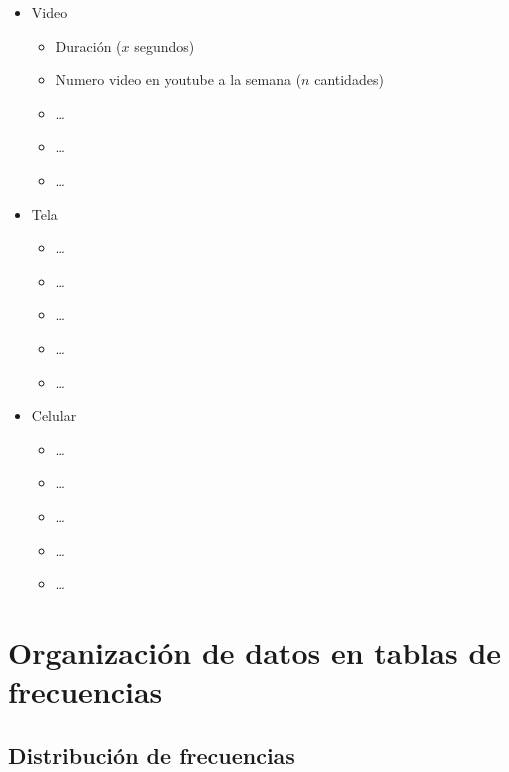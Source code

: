 \documentclass[10pt,]{krantz}
\providecommand{\tightlist}{%
  \setlength{\itemsep}{0pt}\setlength{\parskip}{0pt}}
\theoremstyle{definition}
\theoremstyle{definition}
\theoremstyle{definition}
\theoremstyle{definition}
\theoremstyle{remark}
\begin{document}
\begin{enumerate}
  \begin{itemize}
  \item
    Video

    \begin{itemize}
    \tightlist
    \item
      Duración (\(x\) segundos)
    \item
      Numero video en youtube a la semana (\(n\) cantidades)
    \item
      \ldots{}
    \item
      \ldots{}
    \item
      \ldots{}
    \end{itemize}
  \item
    Tela

    \begin{itemize}
    \tightlist
    \item
      \ldots{}
    \item
      \ldots{}
    \item
      \ldots{}
    \item
      \ldots{}
    \item
      \ldots{}
    \end{itemize}
  \item
    Celular

    \begin{itemize}
    \tightlist
    \item
      \ldots{}
    \item
      \ldots{}
    \item
      \ldots{}
    \item
      \ldots{}
    \item
      \ldots{}
    \end{itemize}
  \end{itemize}
\end{enumerate}

\hypertarget{organizaciuxf3n-de-datos-en-tablas-de-frecuencias}{%
\chapter{Organización de datos en tablas de frecuencias}\label{organizaciuxf3n-de-datos-en-tablas-de-frecuencias}}

\hypertarget{distribuciuxf3n-de-frecuencias}{%
\section{Distribución de frecuencias}\label{distribuciuxf3n-de-frecuencias}}
\end{document}
